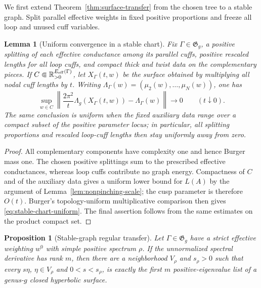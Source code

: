 \documentclass[11pt,reqno]{amsart}
\newtheorem{proposition}[theorem]{Proposition}
\newtheorem{lemma}[theorem]{Lemma}
\theoremstyle{definition}
\theoremstyle{remark}
\newcommand{\R}{\mathbb R}
\begin{document}
We first extend Theorem~\ref{thm:surface-transfer} from the chosen tree to a
stable graph.  Split parallel effective weights in fixed positive
proportions and freeze all loop and unused cuff variables.

\begin{lemma}[Uniform convergence in a stable chart]
\label{lem:stable-chart-uniform}
Fix $\Gamma\in\mathfrak G_g$, a positive splitting of each effective
conductance among its parallel cuffs, positive rescaled lengths for all loop
cuffs, and compact thick and twist data on the complementary pieces.  If
$C\Subset\R_{>0}^{E_{\rm eff}(\Gamma)}$, let $X_\Gamma(t,w)$ be the surface
obtained by multiplying all nodal cuff lengths by $t$.  Writing
$\Lambda_\Gamma(w)=(\mu_2(w),\ldots,\mu_N(w))$, one has
\begin{equation}\label{eq:stable-chart-uniform}
 \sup_{w\in C}\left\|
 \frac{2\pi^2}{t}\Lambda_g(X_\Gamma(t,w))-\Lambda_\Gamma(w)
 \right\|\longrightarrow0
 \qquad(t\downarrow0).
\end{equation}
The same conclusion is uniform when the fixed auxiliary data range over a
compact subset of the positive parameter locus; in particular, all splitting
proportions and rescaled loop-cuff lengths then stay uniformly away from zero.
\end{lemma}

\begin{proof}
All complementary components have complexity one and hence Burger mass one.
The chosen positive splittings sum to the prescribed effective
conductances, whereas loop cuffs contribute no graph energy.  Compactness of
$C$ and of the auxiliary data gives a uniform lower bound for $L(A)$ by the
argument of Lemma~\ref{lem:nonpinching-scale}; the cusp parameter is therefore
$O(t)$.  Burger's topology-uniform multiplicative comparison then gives
\eqref{eq:stable-chart-uniform}.  The final assertion follows from the same
estimates on the product compact set.
\end{proof}

\begin{proposition}[Stable-graph regular transfer]
\label{prop:stable-transfer}
Let $\Gamma\in\mathfrak G_g$ have a strict effective weighting $w^0$ with
simple positive spectrum $\rho$.  If the unnormalized spectral derivative
has rank $m$, then there are a neighborhood $V_\rho$ and $s_\rho>0$ such
that every $s\eta$, $\eta\in V_\rho$ and $0<s<s_\rho$, is exactly the first
$m$ positive-eigenvalue list of a genus-$g$ closed hyperbolic surface.
\end{proposition}
\end{document}

